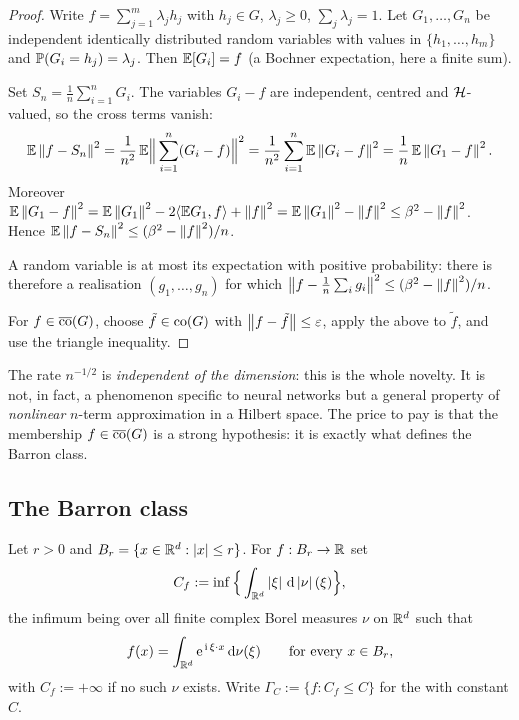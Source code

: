 \documentclass[11pt,a4paper]{article}
\begin{document}
\begin{proof}
Write $f = \sum_{j=1}^m \lambda_j h_j$ with $h_j \in G$, $\lambda_j \ge 0$, $\sum_j \lambda_j = 1$.
Let $G_1, \dots, G_n$ be independent identically distributed random variables with values in
$\{h_1,\dots,h_m\}$ and $\mathbb{P}(G_i = h_j) = \lambda_j$. Then $\mathbb{E}[G_i] = f$ (a Bochner expectation,
here a finite sum).

Set $S_n = \frac1n \sum_{i=1}^n G_i$. The variables $G_i - f$ are independent, centred and
$\mathcal{H}$-valued, so the cross terms vanish:
\[
\mathbb{E} \left\lVert f - S_n \right\rVert^2
= \frac{1}{n^2}\, \mathbb{E}\Big\| \sum_{i=1}^n (G_i - f) \Big\|^2
= \frac{1}{n^2} \sum_{i=1}^n \mathbb{E}\left\lVert G_i - f \right\rVert^2
= \frac{1}{n}\, \mathbb{E}\left\lVert G_1 - f \right\rVert^2 .
\]
Moreover $\mathbb{E}\left\lVert G_1 - f \right\rVert^2 = \mathbb{E}\left\lVert G_1 \right\rVert^2 - 2\langle \mathbb{E} G_1 , f \rangle + \left\lVert f \right\rVert^2
= \mathbb{E}\left\lVert G_1 \right\rVert^2 - \left\lVert f \right\rVert^2 \le \beta^2 - \left\lVert f \right\rVert^2$. Hence
$\mathbb{E}\left\lVert f - S_n \right\rVert^2 \le (\beta^2 - \left\lVert f \right\rVert^2)/n$.

A random variable is at most its expectation with positive probability: there is therefore a
realisation $(g_1,\dots,g_n)$ for which
$\left\lVert f - \frac1n\sum_i g_i \right\rVert^2 \le (\beta^2 - \left\lVert f \right\rVert^2)/n$.

For $f \in \overline{\operatorname{co}}(G)$, choose $\tilde f \in \operatorname{co}(G)$ with
$\left\lVert f - \tilde f \right\rVert \le \varepsilon$, apply the above to $\tilde f$, and use the triangle
inequality.
\end{proof}

\begin{remark}
The rate $n^{-1/2}$ is \emph{independent of the dimension}: this is the whole novelty. It is not, in
fact, a phenomenon specific to neural networks but a general property of \emph{nonlinear} $n$-term
approximation in a Hilbert space. The price to pay is that the membership $f \in \overline{\operatorname{co}}(G)$
is a strong hypothesis: it is exactly what defines the Barron class.
\end{remark}

\subsection{The Barron class}

\begin{definition}\label{def:barron}
Let $r > 0$ and $B_r = \{x \in \mathbb{R}^d : \left\lvert x \right\rvert \le r\}$. For $f : B_r \to \mathbb{R}$ set
\[
C_f := \inf \Big\{ \int_{\mathbb{R}^d} \left\lvert \xi \right\rvert\,\mathrm{d}\left\lvert \nu \right\rvert(\xi) \Big\},
\]
the infimum being over all finite complex Borel measures $\nu$ on $\mathbb{R}^d$ such that
\[
f(x) = \int_{\mathbb{R}^d} \mathrm{e}^{\,\mathrm{i}\, \xi\cdot x}\, \mathrm{d}\nu(\xi)
\qquad \text{for every } x \in B_r ,
\]
with $C_f := +\infty$ if no such $\nu$ exists. Write $\Gamma_C := \{ f : C_f \le C\}$ for the
 with constant $C$.
\end{definition}
\end{document}
